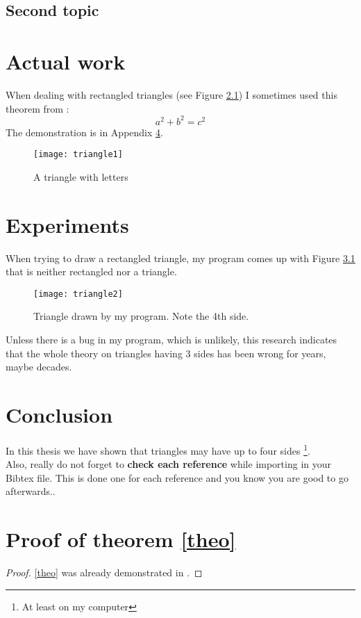 \documentclass{thesisreport}
\begin{document}
 \section{Second topic}
 
 \chapter{Actual work}
  
 
 When dealing with rectangled triangles (see Figure \ref{triangle}) I sometimes used this theorem from \cite{pythm001}:
 \begin{equation}\label{theo}
  a^2 + b^2 = c^2
 \end{equation}The demonstration is in Appendix \ref{sec:prooftheorem}.
 
 \begin{figure}[h]\centering
  \texttt{[image: triangle1]}
  \caption{A triangle with letters} \label{triangle}
 \end{figure}
 
 


 
 
 \chapter{Experiments}
 
 When trying to draw a rectangled triangle, my program comes up with Figure \ref{triangle2} that is neither rectangled nor a triangle.
 
  \begin{figure}[h]\centering
  \texttt{[image: triangle2]}
  \caption{Triangle drawn by my program. Note the 4th side.} \label{triangle2}
 \end{figure}
 
Unless there is a bug in my program, which is unlikely, this research indicates that the whole theory on triangles having 3 sides has been wrong for years, maybe decades.
 
 
 \chapter*{Conclusion}
 
 
In this thesis we have shown that triangles may have up to four sides \footnote{At least on my computer}.\\

Also, really do not forget to {\bf check each reference} while importing in your Bibtex file. This is done one for each reference and you know you are good to go afterwards..
 
 
 \appendix	
 
 \chapter{Proof of theorem \ref{theo}}
 \label{sec:prooftheorem}
 
 
 \begin{proof}
\eqref{theo} was already demonstrated in \cite{euclides300}.
\end{proof}
 
 
 
 
 
 
 
\end{document}
